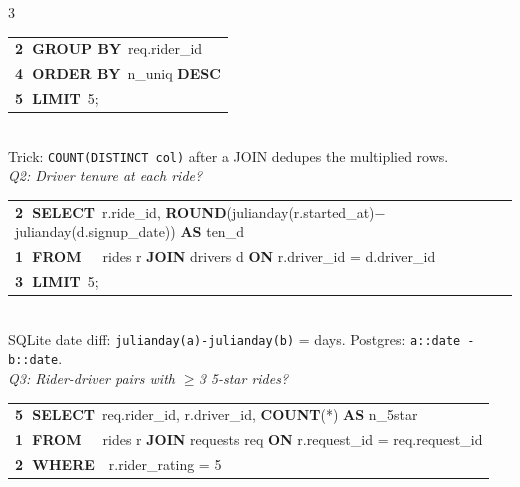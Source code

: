 \documentclass[landscape,letterpaper,9pt]{extarticle}
\begin{document}
\begin{multicols*}{3}
{\begin{minipage}{\dimexpr\linewidth-2pt}
{\begin{tabular}{@{}l@{}}
\textcolor{stepWhere}{\textbf{\textcircled{\scriptsize 2} GROUP BY}~req.rider\_id} \\
\textcolor{stepHaving}{\textbf{\textcircled{\scriptsize 4} ORDER BY}~n\_uniq \textbf{DESC}} \\
\textcolor{stepSelect}{\textbf{\textcircled{\scriptsize 5} LIMIT}~5;} \\
\end{tabular}}
\end{minipage}}
\\[1pt]
\textcolor{cmt}{\scriptsize Trick: \texttt{COUNT(DISTINCT col)} after a JOIN dedupes the multiplied rows.}\\[3pt]
\textit{\scriptsize Q2: Driver tenure at each ride?}\\[1pt]
\colorbox{black!4}{%
\begin{minipage}{\dimexpr\linewidth-2pt}
{\ttfamily\scriptsize
\begin{tabular}{@{}l@{}}
\textcolor{stepWhere}{\textbf{\textcircled{\scriptsize 2} SELECT}~r.ride\_id, \textbf{ROUND}(julianday(r.started\_at)$-$julianday(d.signup\_date)) \textbf{AS} ten\_d} \\
\textcolor{stepFrom}{\textbf{\textcircled{\scriptsize 1} FROM}~~~rides r \textbf{JOIN} drivers d \textbf{ON} r.driver\_id = d.driver\_id} \\
\textcolor{stepGroup}{\textbf{\textcircled{\scriptsize 3} LIMIT}~5;} \\
\end{tabular}}
\end{minipage}}
\\[1pt]
\textcolor{cmt}{\scriptsize SQLite date diff: \texttt{julianday(a)-julianday(b)} = days. Postgres: \texttt{a::date - b::date}.}\\[3pt]
\textit{\scriptsize Q3: Rider-driver pairs with $\geq$3 5-star rides?}\\[1pt]
\colorbox{black!4}{%
\begin{minipage}{\dimexpr\linewidth-2pt}
{\ttfamily\scriptsize
\begin{tabular}{@{}l@{}}
\textcolor{stepSelect}{\textbf{\textcircled{\scriptsize 5} SELECT}~req.rider\_id, r.driver\_id, \textbf{COUNT}(*) \textbf{AS} n\_5star} \\
\textcolor{stepFrom}{\textbf{\textcircled{\scriptsize 1} FROM}~~~rides r \textbf{JOIN} requests req \textbf{ON} r.request\_id = req.request\_id} \\
\textcolor{stepWhere}{\textbf{\textcircled{\scriptsize 2} WHERE}~~r.rider\_rating = 5} \\

\end{tabular}}
\end{minipage}}
\end{multicols*}
\end{document}
